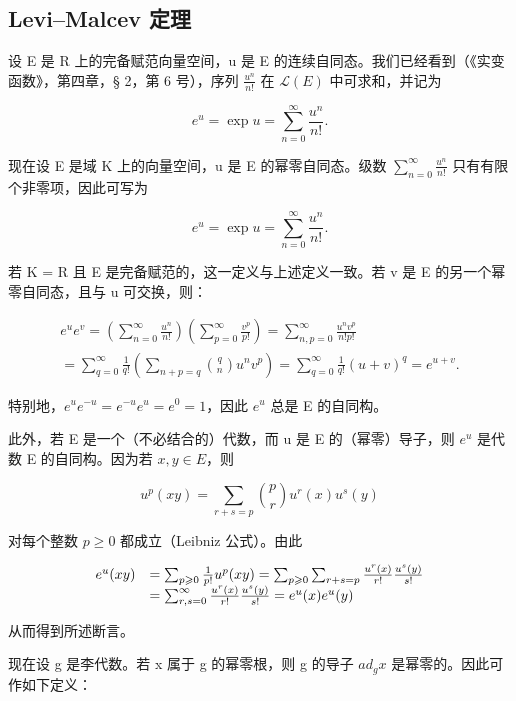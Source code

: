 \subsection{Levi--Malcev 定理}

设 E 是 R 上的完备赋范向量空间，u 是 E 的连续自同态。我们已经看到（《实变函数》，第四章，§ 2，第 6 号），序列 \(\frac{u^{n}}{n!}\) 在 \(\mathcal{L}(E)\) 中可求和，并记为

\[
e ^ {u} = \exp u = \sum_ {n = 0} ^ {\infty} \frac {u ^ {n}}{n !}.
\]

现在设 E 是域 K 上的向量空间，u 是 E 的幂零自同态。级数 \(\sum_{n=0}^{\infty}\frac{u^{n}}{n!}\) 只有有限个非零项，因此可写为

\[
e ^ {u} = \exp u = \sum_ {n = 0} ^ {\infty} \frac {u ^ {n}}{n !}.
\]

若 K = R 且 E 是完备赋范的，这一定义与上述定义一致。若 v 是 E 的另一个幂零自同态，且与 u 可交换，则：

\[
\begin{array}{l} e ^ {u} e ^ {v} = \left(\sum_ {n = 0} ^ {\infty} \frac {u ^ {n}}{n !}\right) \left(\sum_ {p = 0} ^ {\infty} \frac {v ^ {p}}{p !}\right) = \sum_ {n, p = 0} ^ {\infty} \frac {u ^ {n} v ^ {p}}{n ! p !} \\ = \sum_ {q = 0} ^ {\infty} \frac {1}{q !} \left(\sum_ {n + p = q} \binom {q} {n} u ^ {n} v ^ {p}\right) = \sum_ {q = 0} ^ {\infty} \frac {1}{q !} (u + v) ^ {q} = e ^ {u + v}. \end{array}\tag{3}
\]

特别地，\(e^u e^{-u} = e^{-u}e^u = e^0 = 1\)，因此 \(e^u\) 总是 E 的自同构。

此外，若 E 是一个（不必结合的）代数，而 u 是 E 的（幂零）导子，则 \(e^{u}\) 是代数 E 的自同构。因为若 \(x, y \in E\)，则

\[
u ^ {p} (x y) = \sum_ {r + s = p} \binom {p} {r} u ^ {r} (x) u ^ {s} (y)
\]

对每个整数 \(p \geqslant 0\) 都成立（Leibniz 公式）。由此

\[
\begin{array}{r l} e ^ {u} (x y) & = \sum_ {p \geqslant 0} \frac {1}{p !} u ^ {p} (x y) = \sum_ {p \geqslant 0} \sum_ {r + s = p} \frac {u ^ {r} (x)}{r !} \frac {u ^ {s} (y)}{s !} \\ & = \sum_ {r, s = 0} ^ {\infty} \frac {u ^ {r} (x)}{r !} \frac {u ^ {s} (y)}{s !} = e ^ {u} (x) e ^ {u} (y) \end{array}
\]

从而得到所述断言。

现在设 g 是李代数。若 x 属于 g 的幂零根，则 g 的导子 \(ad_{g}x\) 是幂零的。因此可作如下定义：

